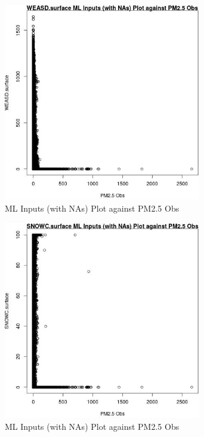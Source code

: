 \begin{figure} 
\centering  
\includegraphics[width=0.77\textwidth]{Code_Outputs/Report_ML_input_PM25_Step4_part_e_de_duplicated_aves_compiled_2019-05-21wNAs_WEASDsurfacevPM25_Obs.jpg} 
\caption{\label{fig:Report_ML_input_PM25_Step4_part_e_de_duplicated_aves_compiled_2019-05-21wNAsWEASDsurfacevPM25_Obs}ML Inputs (with NAs) Plot against PM2.5 Obs} 
\end{figure} 
 

\clearpage 

\begin{figure} 
\centering  
\includegraphics[width=0.77\textwidth]{Code_Outputs/Report_ML_input_PM25_Step4_part_e_de_duplicated_aves_compiled_2019-05-21wNAs_SNOWCsurfacevPM25_Obs.jpg} 
\caption{\label{fig:Report_ML_input_PM25_Step4_part_e_de_duplicated_aves_compiled_2019-05-21wNAsSNOWCsurfacevPM25_Obs}ML Inputs (with NAs) Plot against PM2.5 Obs} 
\end{figure} 
 

